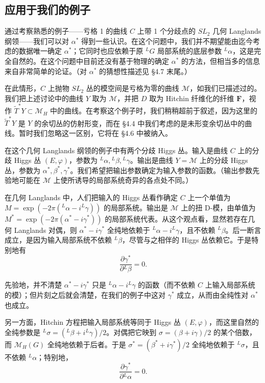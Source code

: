 \subsection{应用于我们的例子}

通过考察熟悉的例子——亏格 1 的曲线 $C$ 上带 1 个分歧点的 $SL_2$ 几何 Langlands 纲领——我们可以对 $\alpha^*$ 得到一些认识。在这个问题中，我们并不期望能由迄今考虑的数据唯一确定 $\alpha^*$；它同时也应依赖于原 ${}^LG$ 局部系统的底层参数 ${}^L\alpha$，这是完全自然的。在这个问题中目前还没有基于物理的确定 $\alpha^*$ 的方法，但相当多的信息来自非常简单的论证。（对 $\alpha^*$ 的猜想性描述见 §4.7 末尾。）

在此情形，$C$ 上抛物 $SL_2$ 丛的模空间是亏格为零的曲线 $\mathcal{M}$，如我们已描述过的。我们把上述讨论中的曲线 $Y$ 取为 $\mathcal{M}$，并把 $D$ 取为 Hitchin 纤维化的纤维 $\boldsymbol{F}$，视作 $\widetilde{T}^*Y\subset\mathcal{M}_H$ 中的曲线。在考察这个例子时，我们稍稍超前于叙述，因为这里的 $\widetilde{T}^*Y$ 是 $Y$ 的余切丛的仿射形变，而在 §4.4 中我们考虑的是未形变余切丛中的曲线。暂时我们忽略这一区别，它将在 §4.6 中被纳入。

在这个几何 Langlands 纲领的例子中有两个分歧 Higgs 丛。输入是曲线 $C$ 上的分歧 Higgs 丛 $(E,\varphi)$，参数为 ${}^L\alpha,{}^L\beta,{}^L\gamma$。输出是曲线 $Y=\mathcal{M}$ 上的分歧 Higgs 丛，参数为 $\alpha^*,\beta^*,\gamma^*$。我们希望把输出参数确定为输入参数的函数。（输出参数先验地可能在 $\mathcal{M}$ 上使所诱导的局部系统奇异的各点处不同。）

在几何 Langlands 中，人们把输入的 Higgs 丛看作确定 $C$ 上一个单值为 $M=\exp(-2\pi({}^L\alpha-i{}^L\gamma))$ 的局部系统。输出是 $\mathcal{M}$ 上的扭 D-模，由单值为 $M^*=\exp(-2\pi(\alpha^*-i\gamma^*))$ 的局部系统代表。从这个观点看，显然若存在几何 Langlands 对偶，则 $\alpha^*-i\gamma^*$ 全纯地依赖于 ${}^L\alpha-i{}^L\gamma$，且不依赖 ${}^L\beta$。后一断言成立，是因为输入局部系统不依赖 ${}^L\beta$，尽管与之相伴的 Higgs 丛依赖它。于是特别地有
\begin{equation}\tag{4.11}
\frac{\partial\gamma^*}{\partial{}^L\beta}=0.
\end{equation}

先验地，并不清楚 $\alpha^*-i\gamma^*$ 只是 ${}^L\alpha-i{}^L\gamma$ 的函数（而不依赖 $C$ 上输入局部系统的模）；但片刻之后就会清楚，在我们的例子中这对 $\gamma^*$ 成立，从而由全纯性对 $\alpha^*$ 也成立。

另一方面，Hitchin 方程把输入局部系统等同于 Higgs 丛 $(E,\varphi)$，而这里自然的全纯参数是 ${}^L\sigma=({}^L\beta+i{}^L\gamma)/2$。对偶把它映到 $\sigma=(\beta+i\gamma)/2$ 的某个倍数，而 $\mathcal{M}_H(G)$ 全纯地依赖于后者。于是 $\sigma^*=(\beta^*+i\gamma^*)/2$ 全纯地依赖于 ${}^L\sigma$，且不依赖 ${}^L\alpha$；特别地，
\begin{equation}\tag{4.12}
\frac{\partial\gamma^*}{\partial{}^L\alpha}=0.
\end{equation}

